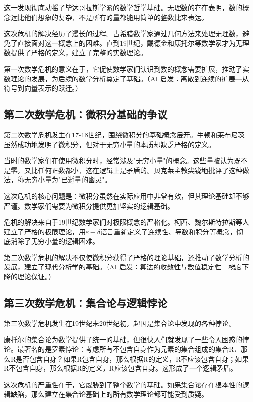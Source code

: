 这一发现彻底动摇了毕达哥拉斯学派的数学哲学基础。无理数的存在表明，数的概念远比他们想象的复杂，不是所有的量都能用简单的整数比来表达。

这次危机的解决经历了漫长的过程。古希腊数学家通过几何方法来处理无理数，避免了直接面对这一概念上的困难。直到19世纪，戴德金和康托尔等数学家才为无理数提供了严格的定义，建立了完整的实数理论。

第一次数学危机的意义在于，它促使数学家们认识到数的概念需要扩展，推动了实数理论的发展，为后续的数学分析奠定了基础。{（AI 启发：离散到连续的扩展—从符号到向量表示的跃迁。）}

\subsection{第二次数学危机：微积分基础的争议}
第二次数学危机发生在17-18世纪，围绕微积分的基础概念展开。牛顿和莱布尼茨虽然成功地发明了微积分，但对于无穷小量的本质却缺乏严格的定义。

当时的数学家们在使用微积分时，经常涉及"无穷小量"的概念。这些量被认为既不是零，又比任何正数都小，这在逻辑上是矛盾的。贝克莱主教尖锐地批评了这种做法，称无穷小量为"已逝量的幽灵"。

这次危机的核心问题是：微积分虽然在实际应用中非常有效，但其理论基础却不够严谨。数学家们需要为微积分提供更加坚实的逻辑基础。

危机的解决来自于19世纪数学家们对极限概念的严格化。柯西、魏尔斯特拉斯等人建立了严格的极限理论，用$\varepsilon-\delta$语言重新定义了连续性、导数和积分等概念，彻底消除了无穷小量的逻辑困难。

第二次数学危机的解决不仅使微积分获得了严格的理论基础，还推动了数学分析的发展，建立了现代分析学的基础。{（AI 启发：算法的收敛性与数值稳定性—梯度下降的理论保证。）}

\subsection{第三次数学危机：集合论与逻辑悖论}
第三次数学危机发生在19世纪末20世纪初，起因是集合论中发现的各种悖论。

康托尔的集合论为数学提供了统一的基础，但很快人们就发现了一些令人困惑的悖论。最著名的是罗素悖论：考虑所有不包含自身作为元素的集合组成的集合R，那么R是否包含自身？如果R包含自身，那么根据R的定义，R不应该包含自身；如果R不包含自身，那么根据R的定义，R应该包含自身。这形成了一个逻辑矛盾。

这次危机的严重性在于，它威胁到了整个数学的基础。如果集合论存在根本性的逻辑缺陷，那么建立在集合论基础上的所有数学理论都可能受到质疑。

